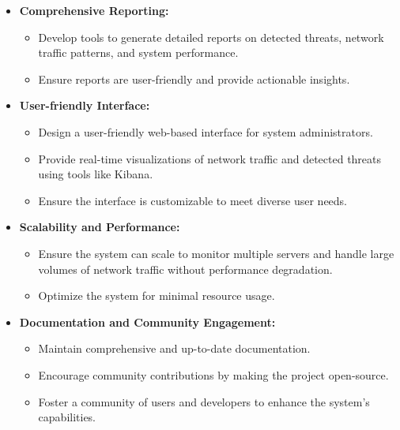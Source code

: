 \documentclass{article}
\begin{document}
\begin{itemize}
        \item \textbf{Comprehensive Reporting:}
        \begin{itemize}
            \item Develop tools to generate detailed reports on detected threats, network traffic patterns, and system performance.
            \item Ensure reports are user-friendly and provide actionable insights.
        \end{itemize}

        \item \textbf{User-friendly Interface:}
        \begin{itemize}
            \item Design a user-friendly web-based interface for system administrators.
            \item Provide real-time visualizations of network traffic and detected threats using tools like Kibana.
            \item Ensure the interface is customizable to meet diverse user needs.
        \end{itemize}

        \item \textbf{Scalability and Performance:}
        \begin{itemize}
            \item Ensure the system can scale to monitor multiple servers and handle large volumes of network traffic without performance degradation.
            \item Optimize the system for minimal resource usage.
        \end{itemize}

        \item \textbf{Documentation and Community Engagement:}
        \begin{itemize}
            \item Maintain comprehensive and up-to-date documentation.
            \item Encourage community contributions by making the project open-source.
            \item Foster a community of users and developers to enhance the system's capabilities.
        \end{itemize}
    \end{itemize}
\end{document}
